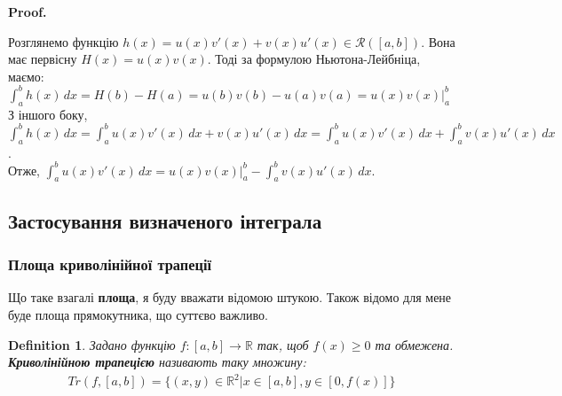 \documentclass[a4paper, 10pt]{article}
\makeatletter
\def\huge{\displaystyle}
\def\qed{$\blacksquare$}
\theoremstyle{theoremdd}
\theoremstyle{theoremdd}
\newtheorem{definition}[theorem]{Definition}
\theoremstyle{theoremdd}
\theoremstyle{theoremdd}
\theoremstyle{theoremdd}
\theoremstyle{theoremdd}
\theoremstyle{theoremdd}
\theoremstyle{theoremdd}
\renewenvironment{proof}[1][Proof.\\]{\par
\pushQED{\hfill \qed}%
\normalfont \topsep6\p@\@plus6\p@\relax
\trivlist
\item\relax
{\bfseries
#1\@addpunct{.}}\hspace\labelsep\ignorespaces
}{%
\popQED\endtrivlist\@endpefalse
}
\makeatother
\begin{document}
\begin{proof}
Розглянемо функцію $h(x) = u(x)v'(x) + v(x)u'(x) \in \mathcal{R}([a,b])$. Вона має первісну $H(x) = u(x)v(x)$. Тоді за формулою Ньютона-Лейбніца, маємо:\\
$\huge\int_a^b h(x)\,dx = H(b)-H(a) = u(b)v(b) - u(a)v(a) = u(x)v(x) \Big|_a^b$\\
З іншого боку, $\huge\int_a^b h(x)\,dx = \int_a^b u(x)v'(x)\,dx + v(x)u'(x)\,dx = \int_a^b u(x)v'(x)\,dx + \int_a^b v(x)u'(x)\,dx$.\\
Отже, $\huge\int_a^b u(x)v'(x)\,dx = u(x)v(x) \Big|_{a}^{b} - \int_a^b v(x)u'(x)\,dx$.
\end{proof}


\subsection{Застосування визначеного інтеграла}
\subsubsection{Площа криволінійної трапеції}
Що таке взагалі \textbf{площа}, я буду вважати відомою штукою. Також відомо для мене буде площа прямокутника, що суттєво важливо.

\begin{definition}
Задано функцію $f: [a,b] \to \mathbb{R}$ так, щоб $f(x) \geq 0$ та обмежена.\\
\textbf{Криволінійною трапецією} називають таку множину:
\begin{align*}
Tr(f,[a,b]) = \{(x,y) \in \mathbb{R}^2 | x \in [a,b], y \in [0, f(x)] \}
\end{align*}
\begin{figure}[H]
\centering
{}
\end{figure}
\end{definition}
\end{document}
